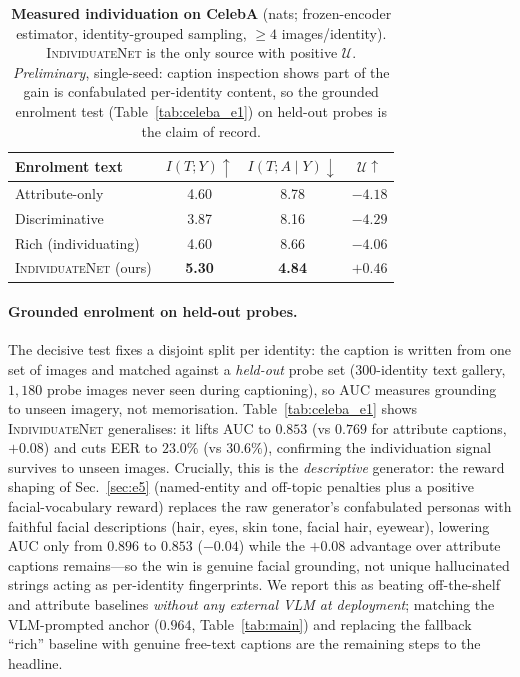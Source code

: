 \documentclass[10pt,twocolumn,letterpaper]{article}
\newcommand{\U}{\mathcal{U}}
\newcommand{\method}{\textsc{IndividuateNet}}
\begin{document}
\begin{table}[t]
  \centering\small
  \setlength{\tabcolsep}{6pt}
  \begin{tabular}{@{}lccc@{}}
    \toprule
    \textbf{Enrolment text} & $I(T;Y)\!\uparrow$ & $I(T;A\!\mid\!Y)\!\downarrow$ & $\U\!\uparrow$ \\
    \midrule
    Attribute-only        & 4.60 & 8.78 & $-4.18$ \\
    Discriminative        & 3.87 & 8.16 & $-4.29$ \\
    Rich (individuating)  & 4.60 & 8.66 & $-4.06$ \\
    \method{} (ours)      & \textbf{5.30} & \textbf{4.84} & $\mathbf{+0.46}$ \\
    \bottomrule
  \end{tabular}
  \caption{\textbf{Measured individuation on CelebA} (nats; frozen-encoder estimator,
  identity-grouped sampling, $\ge 4$ images/identity). \method{} is the only source with
  positive $\U$. \emph{Preliminary}, single-seed: caption inspection shows part of the gain is
  confabulated per-identity content, so the grounded enrolment test (Table~\ref{tab:celeba_e1})
  on held-out probes is the claim of record.}
  \label{tab:celeba_u}
\end{table}

\paragraph{Grounded enrolment on held-out probes.}
The decisive test fixes a disjoint split per identity: the caption is written from one set of
images and matched against a \emph{held-out} probe set (300-identity text gallery,
$1{,}180$ probe images never seen during captioning), so AUC measures grounding to unseen
imagery, not memorisation. Table~\ref{tab:celeba_e1} shows \method{} generalises: it lifts AUC
to $0.853$ (vs $0.769$ for attribute captions, $+0.08$) and cuts EER to $23.0\%$ (vs $30.6\%$),
confirming the individuation signal survives to unseen images. Crucially, this is the
\emph{descriptive} generator: the reward shaping of Sec.~\ref{sec:e5} (named-entity and
off-topic penalties plus a positive facial-vocabulary reward) replaces the raw generator's
confabulated personas with faithful facial descriptions (hair, eyes, skin tone, facial hair,
eyewear), lowering AUC only from $0.896$ to $0.853$ ($-0.04$) while the $+0.08$ advantage over
attribute captions remains---so the win is genuine facial grounding, not unique
hallucinated strings acting as per-identity fingerprints. We report this as beating
off-the-shelf and attribute baselines \emph{without any external VLM at deployment}; matching
the VLM-prompted anchor ($0.964$, Table~\ref{tab:main}) and replacing the fallback
``rich'' baseline with genuine free-text captions are the remaining steps to the headline.
\end{document}

